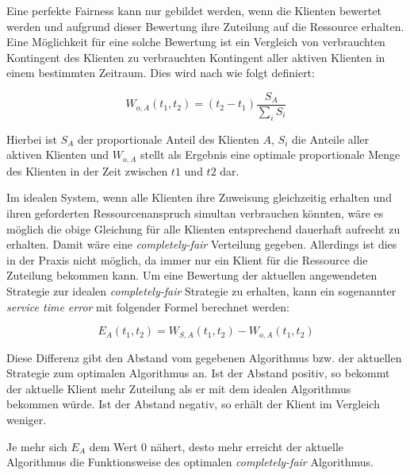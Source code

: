 Eine perfekte Fairness kann nur gebildet werden, wenn die Klienten bewertet werden und aufgrund dieser Bewertung ihre Zuteilung auf die Ressource erhalten.
Eine Möglich\-keit für eine solche Bewertung ist ein Vergleich von verbrauchten Kontingent des Klienten zu verbrauchten Kontingent aller aktiven Klienten in einem bestimmten Zeitraum. 
Dies wird nach \cite{usenix} wie folgt definiert:

\begin{equation}
W_{o,A}(t_1,t_2) = (t_2-t_1) \frac{S_A}{\sum_i S_i}
\label{eq:perfect_fairness}
\end{equation}

Hierbei ist $S_A$ der proportionale Anteil des Klienten $A$, $S_i$ die Anteile aller aktiven Klienten und $W_{o,A}$ stellt als Ergebnis eine optimale proportionale Menge des Klienten in der Zeit zwischen $t1$ und $t2$ dar.

Im idealen System, wenn alle Klienten ihre Zuweisung gleichzeitig erhalten und ihren geforderten Ressourcenanspruch simultan verbrauchen könnten, wäre es möglich die obige Gleichung für alle Klienten entsprechend dauerhaft aufrecht zu erhalten.
Damit wäre eine \textit{completely-fair} Verteilung gegeben. Allerdings ist dies in der Praxis nicht möglich, da immer nur ein Klient für die Ressource die Zuteilung bekommen kann.
Um eine Bewertung der aktuellen angewendeten Strategie zur idealen \textit{completely-fair} Strategie zu erhalten, kann ein sogenannter \textit{service time error} mit folgender Formel berechnet werden:

\begin{equation}
E_A(t_1,t_2) = W_{S,A}(t_1,t_2)-W_{o,A}(t_1,t_2)
\label{eq:error_fairness}
\end{equation}

Diese Differenz gibt den Abstand vom gegebenen Algorithmus bzw. der aktuellen Strategie zum optimalen Algorithmus an.
Ist der Abstand positiv, so bekommt der aktuelle Klient mehr Zuteilung als er mit dem idealen Algorithmus bekommen würde. Ist der Abstand negativ, so erhält der Klient im Vergleich weniger.

Je mehr sich $E_A$ dem Wert 0 nähert, desto mehr erreicht der aktuelle Algorithmus die Funktionsweise des optimalen \textit{completely-fair} Algorithmus.
 



